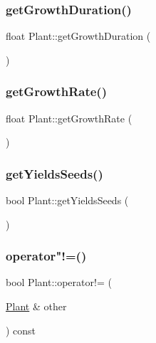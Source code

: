 \subsubsection{\texorpdfstring{get\+Growth\+Duration()}{getGrowthDuration()}}
{\footnotesize\ttfamily float Plant\+::get\+Growth\+Duration (\begin{DoxyParamCaption}{ }\end{DoxyParamCaption})}

\mbox{\label{class_plant_a7f0844398279e81e7e65a7cea52faf45}} 
\subsubsection{\texorpdfstring{get\+Growth\+Rate()}{getGrowthRate()}}
{\footnotesize\ttfamily float Plant\+::get\+Growth\+Rate (\begin{DoxyParamCaption}{ }\end{DoxyParamCaption})}

\mbox{\label{class_plant_a3144642078f06af87392cdd27612b12b}} 
\subsubsection{\texorpdfstring{get\+Yields\+Seeds()}{getYieldsSeeds()}}
{\footnotesize\ttfamily bool Plant\+::get\+Yields\+Seeds (\begin{DoxyParamCaption}{ }\end{DoxyParamCaption})}

\mbox{\label{class_plant_a6ae96ef1da51ed164d62c400cbf9aa5a}} 
\subsubsection{\texorpdfstring{operator"!=()}{operator!=()}}
{\footnotesize\ttfamily bool Plant\+::operator!= (\begin{DoxyParamCaption}\item[{\mbox{\hyperlink{class_plant}{Plant}} \&}]{other }\end{DoxyParamCaption}) const}

